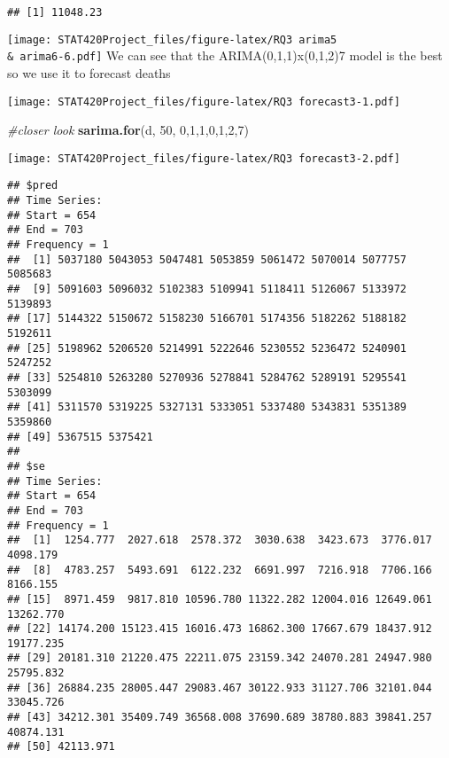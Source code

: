 \documentclass[]{article}
\newenvironment{Shaded}{\begin{snugshade}}{\end{snugshade}}
\newcommand{\CommentTok}[1]{\textcolor[rgb]{0.56,0.35,0.01}{\textit{#1}}}
\newcommand{\DataTypeTok}[1]{\textcolor[rgb]{0.13,0.29,0.53}{#1}}
\newcommand{\DecValTok}[1]{\textcolor[rgb]{0.00,0.00,0.81}{#1}}
\newcommand{\KeywordTok}[1]{\textcolor[rgb]{0.13,0.29,0.53}{\textbf{#1}}}
\newcommand{\NormalTok}[1]{#1}
\newcommand{\OperatorTok}[1]{\textcolor[rgb]{0.81,0.36,0.00}{\textbf{#1}}}
\newcommand{\StringTok}[1]{\textcolor[rgb]{0.31,0.60,0.02}{#1}}
\begin{document}
\begin{verbatim}
## [1] 11048.23
\end{verbatim}

\texttt{[image: STAT420Project\_files/figure-latex/RQ3 arima5 \\\& arima6-6.pdf]}
We can see that the ARIMA(0,1,1)x(0,1,2)7 model is the best so we use it
to forecast deaths

\begin{Shaded}
\end{Shaded}

\texttt{[image: STAT420Project\_files/figure-latex/RQ3 forecast3-1.pdf]}

\begin{Shaded}
\begin{Highlighting}[]
\CommentTok{#closer look}
\KeywordTok{sarima.for}\NormalTok{(d, }\DecValTok{50}\NormalTok{, }\DecValTok{0}\NormalTok{,}\DecValTok{1}\NormalTok{,}\DecValTok{1}\NormalTok{,}\DecValTok{0}\NormalTok{,}\DecValTok{1}\NormalTok{,}\DecValTok{2}\NormalTok{,}\DecValTok{7}\NormalTok{)}
\end{Highlighting}
\end{Shaded}

\texttt{[image: STAT420Project\_files/figure-latex/RQ3 forecast3-2.pdf]}

\begin{verbatim}
## $pred
## Time Series:
## Start = 654 
## End = 703 
## Frequency = 1 
##  [1] 5037180 5043053 5047481 5053859 5061472 5070014 5077757 5085683
##  [9] 5091603 5096032 5102383 5109941 5118411 5126067 5133972 5139893
## [17] 5144322 5150672 5158230 5166701 5174356 5182262 5188182 5192611
## [25] 5198962 5206520 5214991 5222646 5230552 5236472 5240901 5247252
## [33] 5254810 5263280 5270936 5278841 5284762 5289191 5295541 5303099
## [41] 5311570 5319225 5327131 5333051 5337480 5343831 5351389 5359860
## [49] 5367515 5375421
## 
## $se
## Time Series:
## Start = 654 
## End = 703 
## Frequency = 1 
##  [1]  1254.777  2027.618  2578.372  3030.638  3423.673  3776.017  4098.179
##  [8]  4783.257  5493.691  6122.232  6691.997  7216.918  7706.166  8166.155
## [15]  8971.459  9817.810 10596.780 11322.282 12004.016 12649.061 13262.770
## [22] 14174.200 15123.415 16016.473 16862.300 17667.679 18437.912 19177.235
## [29] 20181.310 21220.475 22211.075 23159.342 24070.281 24947.980 25795.832
## [36] 26884.235 28005.447 29083.467 30122.933 31127.706 32101.044 33045.726
## [43] 34212.301 35409.749 36568.008 37690.689 38780.883 39841.257 40874.131
## [50] 42113.971
\end{verbatim}
\end{document}
